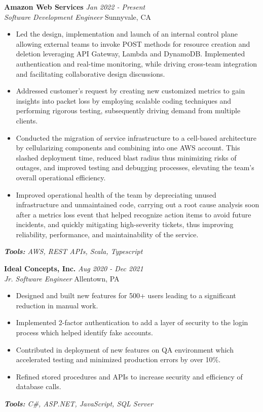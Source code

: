 \documentclass[letterpaper,10pt]{article}
\newcommand{\organization}[4]{
    \vspace{1.5pt}
    \textbf{#1} \hfill{\emph{#2}} \\
    \emph{#3} \hfill{#4} \\
    \vspace{3pt}
}
\newcommand{\toolsused}[1]{
    \vspace{1.5pt}
    \emph{#1}\\
    \vspace{3pt}
}
\newcommand{\bulletsBegin}{
    \vspace{1pt}
    \begin{minipage}{17.6cm}
    \begin{itemize}[leftmargin=0.6cm]
    \setlength\itemsep{-0.1em}
}
\newcommand{\bulletsEnd}{
    \end{itemize}\vspace{0pt}
    \end{minipage}
}
\begin{document}
    	\organization{Amazon Web Services}{Jan 2022 - Present}
        {Software Development Engineer}{Sunnyvale, CA}
        \bulletsBegin
            \item Led the design, implementation and launch of an internal control plane allowing external teams to invoke POST methods for resource creation and deletion leveraging API Gateway, Lambda and DynamoDB. Implemented authentication and real-time monitoring, while driving cross-team integration and facilitating collaborative design discussions.
	    \vspace{-2pt}
            \item Addressed customer's request by creating new customized metrics to gain insights into packet loss by employing scalable coding techniques and performing rigorous testing, subsequently driving demand from multiple clients.
            \item Conducted the migration of service infrastructure to a cell-based architecture by cellularizing components and combining into one AWS account. This  slashed deployment time, reduced blast radius thus minimizing risks of outages, and improved testing and debugging processes, elevating the team's overall operational efficiency.
            \vspace{-2pt}
            \item Improved operational health of the team by depreciating unused infrastructure and unmaintained code, carrying out a root cause analysis soon after a metrics loss event that helped recognize action items to avoid future incidents, and quickly mitigating high-severity tickets, thus improving reliability, performance, and maintainability of the service.
            \vspace{-2pt}
        \bulletsEnd
        \vspace{-4pt}
        \toolsused{\textbf{Tools:} AWS, REST APIs, Scala, Typescript}

    
    	\organization{Ideal Concepts, Inc.}{Aug 2020 - Dec 2021}
        {Jr. Software Engineer}{Allentown, PA}
        \bulletsBegin
            \item Designed and built new features for 500+ users leading to a significant reduction in manual work.
	    \vspace{-2pt}
            \item Implemented 2-factor authentication to add a layer of security to the login process which helped identify fake accounts.
            \item Contributed in deployment of new features on QA environment which accelerated testing and minimized production errors by over 10\%.
            \vspace{-2pt}
            \item Refined stored procedures and APIs to increase security and efficiency of database calls.
            \vspace{-2pt}
        \bulletsEnd
        \vspace{-4pt}
        \toolsused{\textbf{Tools:} C\#, ASP.NET, JavaScript, SQL Server}
\end{document}
